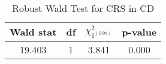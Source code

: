 \begin{table}[H]
\centering
\caption{Robust Wald Test for CRS in CD}
\label{tab:wald}
\begin{tabular}{cccc}
\toprule
Wald stat & df & $\chi^2_{1^{(0.95)}}$ & p-value \\
\midrule
19.403 & 1 & 3.841 & 0.000 \\
\bottomrule
\end{tabular}
\end{table}
